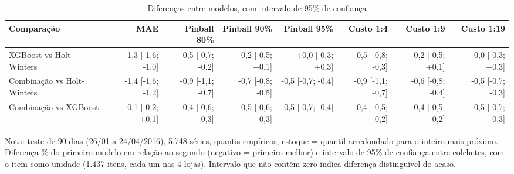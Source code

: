 \begin{table}[htbp]
\centering
\small
\caption{Diferenças entre modelos, com intervalo de 95\% de confiança}
\label{tab:comp_diferencas}
\begin{tabular}{lrrrrrrr}
\toprule
Comparação & MAE & Pinball 80\% & Pinball 90\% & Pinball 95\% & Custo 1:4 & Custo 1:9 & Custo 1:19 \\
\midrule
XGBoost vs Holt-Winters & -1,3 [-1,6; -1,0] & -0,5 [-0,7; -0,2] & -0,2 [-0,5; +0,1] & +0,0 [-0,3; +0,3] & -0,5 [-0,8; -0,3] & -0,2 [-0,5; +0,1] & +0,0 [-0,3; +0,3] \\
Combinação vs Holt-Winters & -1,4 [-1,6; -1,2] & -0,9 [-1,1; -0,7] & -0,7 [-0,8; -0,5] & -0,5 [-0,7; -0,4] & -0,9 [-1,1; -0,7] & -0,6 [-0,8; -0,4] & -0,5 [-0,7; -0,3] \\
Combinação vs XGBoost & -0,1 [-0,2; +0,1] & -0,4 [-0,6; -0,3] & -0,5 [-0,6; -0,3] & -0,5 [-0,7; -0,4] & -0,4 [-0,5; -0,2] & -0,4 [-0,5; -0,2] & -0,5 [-0,7; -0,3] \\
\bottomrule
\end{tabular}
\par\smallskip
{\footnotesize Nota: teste de 90 dias (26/01 a 24/04/2016), 5.748 séries, quantis empíricos, estoque = quantil arredondado para o inteiro mais próximo. Diferença \% do primeiro modelo em relação ao segundo (negativo = primeiro melhor) e intervalo de 95\% de confiança entre colchetes, com o item como unidade (1.437 itens, cada um nas 4 lojas). Intervalo que não contém zero indica diferença distinguível do acaso.}
\end{table}
